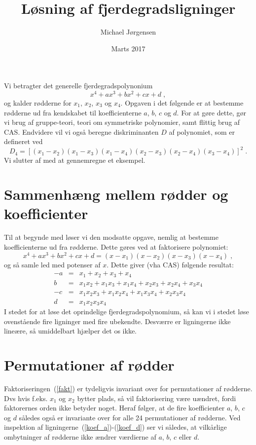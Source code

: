 \documentclass[12pt,oneside,a4paper]{article}
\title{Løsning af fjerdegradsligninger}
\date{Marts 2017}
\author{Michael Jørgensen}
\newcommand{\bea}{\begin{eqnarray}}
\newcommand{\eea}{\end{eqnarray}}
\begin{document}
\maketitle
Vi betragter det generelle fjerdegradspolynonium
\begin{equation}
x^4 + ax^3 + bx^2 + cx + d\;,
\label{eq_4}
\end{equation}
og kalder rødderne for $x_1$, $x_2$, $x_3$ og $x_4$.
Opgaven i det følgende er at bestemme rødderne ud fra kendskabet til
koefficienterne $a$, $b$, $c$ og $d$.
For at gøre dette, gør vi brug af gruppe-teori, teori om
symmetriske polynomier, samt flittig brug af CAS.
Endvidere vil vi også beregne diskriminanten $D$ af polynomiet, som 
er defineret ved
\begin{equation}
    D_4 =
    \left[(x_1-x_2)(x_1-x_3)(x_1-x_4)(x_2-x_3)(x_2-x_4)(x_3-x_4)\right]^2\;.
    \label{eq_dis4}
\end{equation}
Vi slutter af med at gennemregne et eksempel.

\section{Sammenhæng mellem rødder og koefficienter}
Til at begynde med løser vi den modsatte opgave, nemlig at bestemme
koefficienterne ud fra rødderne. Dette gøres ved at faktorisere polynomiet:
\begin{equation}
    x^4 + ax^3 + bx^2 + cx + d = (x-x_1)(x-x_2)(x-x_3)(x-x_4)\;,
    \label{fakt}
\end{equation}
og så samle led med potenser af $x$.
Dette giver (vha CAS) følgende resultat:
\bea
  -a &=& x_1 + x_2 + x_3 + x_4 \label{koef_a} \\
   b &=& x_1x_2 + x_1x_3 + x_1x_4 + x_2x_3 + x_2x_4 + x_3x_4  \label{koef_b}\\
  -c &=& x_1x_2x_3 + x_1x_2x_4 + x_1x_3x_4 + x_2x_3x_4  \label{koef_c}\\
   d &=& x_1x_2x_3x_4 \label{koef_d}
\eea
I stedet for at løse det oprindelige fjerdegradspolynomium, så kan vi i stedet løse ovenstående fire ligninger med fire ubekendte. Desværre er ligningerne ikke lineære, så umiddelbart hjælper det os ikke.

\section{Permutationer af rødder}
Faktoriseringen~(\ref{fakt}) er tydeligvis invariant over for permutationer af
rødderne. Dvs hvis f.eks. $x_1$ og $x_2$ bytter plads, så vil faktorisering være
uændret, fordi faktorernes orden ikke betyder noget.
Heraf følger, at de fire koefficienter $a$, $b$, $c$ og $d$ således også er
invariante over for alle 24 permutationer af rødderne. Ved inspektion af
ligningerne~(\ref{koef_a})-(\ref{koef_d}) ser vi således, at vilkårlige
ombytninger af rødderne ikke ændrer værdierne af $a$, $b$, $c$ eller $d$.
\end{document}
